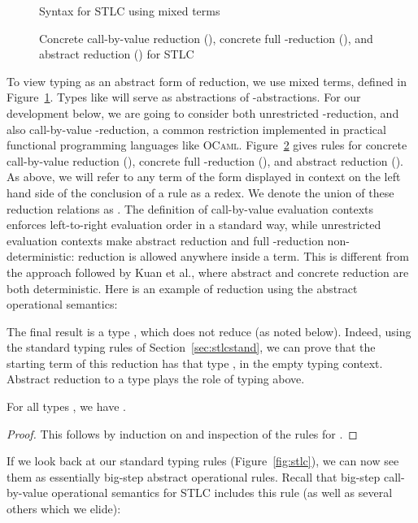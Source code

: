 \documentclass{LMCS}
\begin{document}
\begin{figure}

\caption{Syntax for STLC using mixed terms}
\label{fig:synrestlc}
\end{figure}

\begin{figure}

\caption{Concrete call-by-value reduction (), concrete full -reduction (), and abstract reduction () for STLC}
\label{fig:restlc}
\end{figure}

To view typing as an abstract form of reduction, we use mixed terms,
defined in Figure~\ref{fig:synrestlc}.  Types like  will
serve as abstractions of -abstractions.  For our development
below, we are going to consider both unrestricted -reduction,
and also call-by-value -reduction, a common restriction
implemented in practical functional programming languages like
\textsc{OCaml}.  Figure~\ref{fig:restlc} gives rules for concrete
call-by-value reduction (), concrete full -reduction
(), and abstract reduction ().  As above, we will refer
to any term of the form displayed in context on the left hand side of
the conclusion of a rule as a redex. We denote the union of these
reduction relations as .  The definition of call-by-value
evaluation contexts  enforces left-to-right evaluation order in a
standard way, while unrestricted evaluation contexts  make
abstract reduction and full -reduction non-deterministic:
reduction is allowed anywhere inside a term.  This is different from
the approach followed by Kuan et al., where abstract and concrete
reduction are both deterministic.  Here is an example of reduction using
the abstract operational semantics:

\noindent The final result is a type , which does not reduce (as
noted below).  Indeed, using the standard typing rules of
Section~\ref{sec:stlcstand}, we can prove that the starting term of
this reduction has that type , in the empty typing context.
Abstract reduction to a type plays the role of typing above.

\begin{lem}
\label{lem:tpnorm}
For all types , we have .
\end{lem}
\begin{proof} This follows by induction on  and inspection of the rules for .
\end{proof}

If we look back at our standard typing rules (Figure~\ref{fig:stlc}),
we can now see them as essentially big-step abstract operational
rules.  Recall that big-step call-by-value operational semantics for
STLC includes this rule (as well as several others which we elide):
\end{document}
